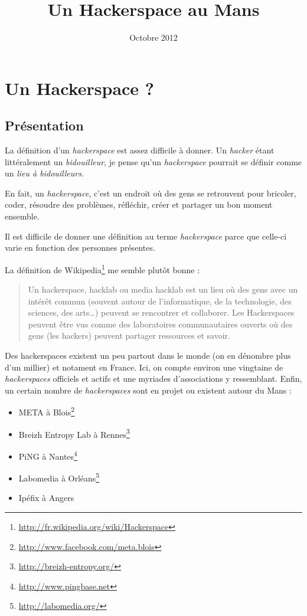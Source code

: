 \documentclass[a4paper, 11pt]{report}
\title{Un Hackerspace au Mans}
\author{}
\date{Octobre 2012}
\newcommand{\hs}{{\itshape hackerspace}}
\newcommand{\hsss}{{\itshape hackerspaces}}
\begin{document}
    \maketitle

    \tableofcontents
    \newpage

    \section{Un Hackerspace ?}

    \subsection{Présentation}

La définition d'un \hs{} est assez difficile à donner. Un {\it hacker} étant littéralement un {\it bidouilleur}, je
pense qu'un \hs{} pourrait se définir comme un {\it lieu à bidouilleurs}.

En fait, un \hs, c'est un endroit où des gens se retrouvent pour bricoler, coder, résoudre des problèmes, réfléchir,
créer et partager un bon moment ensemble.

Il est difficile de donner une définition au terme \hs{} parce que celle-ci varie en fonction des personnes
présentes.

La définition de Wikipedia\footnote{\url{http://fr.wikipedia.org/wiki/Hackerspace}} me semble plutôt bonne :

\begin{quotation}
Un hackerspace, hacklab ou media hacklab est un lieu où des gens avec un intérêt commun (souvent autour de
l'informatique, de la technologie, des sciences, des arts\ldots) peuvent se rencontrer et collaborer. Les Hackerspaces
peuvent être vus comme des laboratoires communautaires ouverts où des gens (les hackers) peuvent partager ressources
et savoir.
\end{quotation}

Des hackerspaces existent un peu partout dans le monde (on en dénombre plus d'un millier) et notament en France.
Ici, on compte environ une vingtaine de \hsss{} officiels et actifs et une myriades d'associations y ressemblant.
Enfin, un certain nombre de \hsss{} sont en projet ou existent autour du Mans :

\begin{itemize}
    \item META à Blois\footnote{\url{http://www.facebook.com/meta.blois}}
    \item Breizh Entropy Lab à Rennes\footnote{\url{http://breizh-entropy.org/}}
    \item PiNG à Nantes\footnote{\url{http://www.pingbase.net}}
    \item Labomedia à Orléans\footnote{\url{http://labomedia.org/}}
    \item Ipéfix à Angers
\end{itemize}
\end{document}
